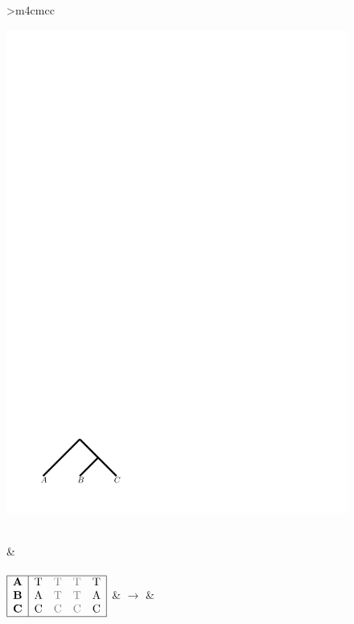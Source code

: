 \begin{figure}
\begin{center}
\begin{tabular}{>{\centering\arraybackslash}m{4cm}cc}
\begin{minipage}[c]{0.25\linewidth}
\begin{center}
              \includegraphics[width=0.6\linewidth]{Figs/TrueOne1.pdf}
            \end{center}
          \end{minipage}
          \\
	  & \\
	  \\
	  $
          \begin{array}{|c|cccc|}
            \hline
            \textbf{A} & \gray{T} & \grey{T} & \grey{T} & \gray{T} \\
            \textbf{B} & \gray{A} & \grey{T} & \grey{T} & \gray{A} \\
            \textbf{C} & \gray{C} & \grey{C} & \grey{C} & \gray{C} \\
            \hline
          \end{array}
	  $
          &
          $\longrightarrow$
          &
          \begin{minipage}[c]{0.25\linewidth}
            \begin{center}

\end{center}
\end{minipage}
\end{tabular}
\end{center}
\end{figure}
